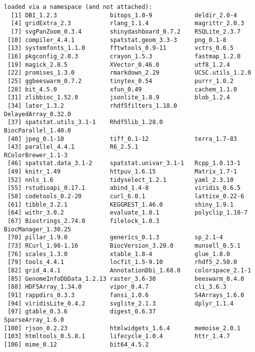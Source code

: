 \documentclass[
  letterpaper,
  DIV=11,
  numbers=noendperiod]{scrreprt}
\begin{document}
\begin{verbatim}
loaded via a namespace (and not attached):
  [1] DBI_1.2.3               bitops_1.0-9            deldir_2.0-4           
  [4] gridExtra_2.3           rlang_1.1.4             magrittr_2.0.3         
  [7] svgPanZoom_0.3.4        shinydashboard_0.7.2    RSQLite_2.3.7          
 [10] compiler_4.4.1          spatstat.geom_3.3-3     png_0.1-8              
 [13] systemfonts_1.1.0       fftwtools_0.9-11        vctrs_0.6.5            
 [16] pkgconfig_2.0.3         crayon_1.5.3            fastmap_1.2.0          
 [19] magick_2.8.5            XVector_0.46.0          utf8_1.2.4             
 [22] promises_1.3.0          rmarkdown_2.29          UCSC.utils_1.2.0       
 [25] ggbeeswarm_0.7.2        tinytex_0.54            purrr_1.0.2            
 [28] bit_4.5.0               xfun_0.49               cachem_1.1.0           
 [31] zlibbioc_1.52.0         jsonlite_1.8.9          blob_1.2.4             
 [34] later_1.3.2             rhdf5filters_1.18.0     DelayedArray_0.32.0    
 [37] spatstat.utils_3.1-1    Rhdf5lib_1.28.0         BiocParallel_1.40.0    
 [40] jpeg_0.1-10             tiff_0.1-12             terra_1.7-83           
 [43] parallel_4.4.1          R6_2.5.1                RColorBrewer_1.1-3     
 [46] spatstat.data_3.1-2     spatstat.univar_3.1-1   Rcpp_1.0.13-1          
 [49] knitr_1.49              httpuv_1.6.15           Matrix_1.7-1           
 [52] nnls_1.6                tidyselect_1.2.1        yaml_2.3.10            
 [55] rstudioapi_0.17.1       abind_1.4-8             viridis_0.6.5          
 [58] codetools_0.2-20        curl_6.0.1              lattice_0.22-6         
 [61] tibble_3.2.1            KEGGREST_1.46.0         shiny_1.9.1            
 [64] withr_3.0.2             evaluate_1.0.1          polyclip_1.10-7        
 [67] Biostrings_2.74.0       filelock_1.0.3          BiocManager_1.30.25    
 [70] pillar_1.9.0            generics_0.1.3          sp_2.1-4               
 [73] RCurl_1.98-1.16         BiocVersion_3.20.0      munsell_0.5.1          
 [76] scales_1.3.0            xtable_1.8-4            glue_1.8.0             
 [79] tools_4.4.1             locfit_1.5-9.10         rhdf5_2.50.0           
 [82] grid_4.4.1              AnnotationDbi_1.68.0    colorspace_2.1-1       
 [85] GenomeInfoDbData_1.2.13 raster_3.6-30           beeswarm_0.4.0         
 [88] HDF5Array_1.34.0        vipor_0.4.7             cli_3.6.3              
 [91] rappdirs_0.3.3          fansi_1.0.6             S4Arrays_1.6.0         
 [94] viridisLite_0.4.2       svglite_2.1.3           dplyr_1.1.4            
 [97] gtable_0.3.6            digest_0.6.37           SparseArray_1.6.0      
[100] rjson_0.2.23            htmlwidgets_1.6.4       memoise_2.0.1          
[103] htmltools_0.5.8.1       lifecycle_1.0.4         httr_1.4.7             
[106] mime_0.12               bit64_4.5.2            
\end{verbatim}
\end{document}
